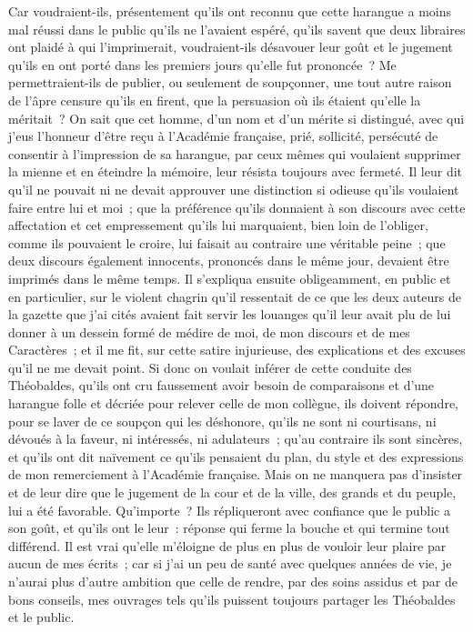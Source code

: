 \documentclass[french,twoside]{book} %
\newcommand\chapterclose{} %
\begin{document}
Car voudraient-ils, présentement qu’ils ont reconnu que cette harangue a moins mal réussi dans le public qu’ils ne l’avaient espéré, qu’ils savent que deux libraires ont plaidé à qui l’imprimerait, voudraient-ils désavouer leur goût et le jugement qu’ils en ont porté dans les premiers jours qu’elle fut prononcée ? Me permettraient-ils de publier, ou seulement de soupçonner, une tout autre raison de l’âpre censure qu’ils en firent, que la persuasion où ils étaient qu’elle la méritait ? On sait que cet homme, d’un nom et d’un mérite si distingué, avec qui j’eus l’honneur d’être reçu à l’Académie française, prié, sollicité, persécuté de consentir à l’impression de sa harangue, par ceux mêmes qui voulaient supprimer la mienne et en éteindre la mémoire, leur résista toujours avec fermeté. Il leur dit qu’il ne pouvait ni ne devait approuver une distinction si odieuse qu’ils voulaient faire entre lui et moi ; que la préférence qu’ils donnaient à son discours avec cette affectation et cet empressement qu’ils lui marquaient, bien loin de l’obliger, comme ils pouvaient le croire, lui faisait au contraire une véritable peine ; que deux discours également innocents, prononcés dans le même jour, devaient être imprimés dans le même temps. Il s’expliqua ensuite obligeamment, en public et en particulier, sur le violent chagrin qu’il ressentait de ce que les deux auteurs de la gazette que j’ai cités avaient fait servir les louanges qu’il leur avait plu de lui donner à un dessein formé de médire de moi, de mon discours et de mes Caractères ; et il me fit, sur cette satire injurieuse, des explications et des excuses qu’il ne me devait point. Si donc on voulait inférer de cette conduite des Théobaldes, qu’ils ont cru faussement avoir besoin de comparaisons et d’une harangue folle et décriée pour relever celle de mon collègue, ils doivent répondre, pour se laver de ce soupçon qui les déshonore, qu’ils ne sont ni courtisans, ni dévoués à la faveur, ni intéressés, ni adulateurs ; qu’au contraire ils sont sincères, et qu’ils ont dit naïvement ce qu’ils pensaient du plan, du style et des expressions de mon remerciement à l’Académie française. Mais on ne manquera pas d’insister et de leur dire que le jugement de la cour et de la ville, des grands et du peuple, lui a été favorable. Qu'importe ? Ils répliqueront avec confiance que le public a son goût, et qu’ils ont le leur : réponse qui ferme la bouche et qui termine tout différend. Il est vrai qu’elle m’éloigne de plus en plus de vouloir leur plaire par aucun de mes écrits ; car si j’ai un peu de santé avec quelques années de vie, je n’aurai plus d’autre ambition que celle de rendre, par des soins assidus et par de bons conseils, mes ouvrages tels qu’ils puissent toujours partager les Théobaldes et le public.
\chapterclose
\end{document}
